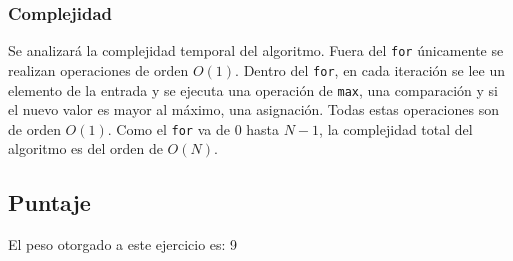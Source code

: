 \subsubsection{Complejidad}
Se analizará la complejidad temporal del algoritmo.
Fuera del \texttt{for} únicamente se realizan operaciones de orden $O(1)$. Dentro del \texttt{for}, en cada iteración se lee un elemento de la entrada y se ejecuta una operación de \texttt{max}, una comparación y si el nuevo valor es mayor al máximo, una asignación. Todas estas operaciones son de orden $O(1)$.
Como el \texttt{for} va de $0$ hasta $N-1$, la complejidad total del algoritmo es del orden de $O(N)$.

\subsection{Puntaje}
El peso otorgado a este ejercicio es: 9